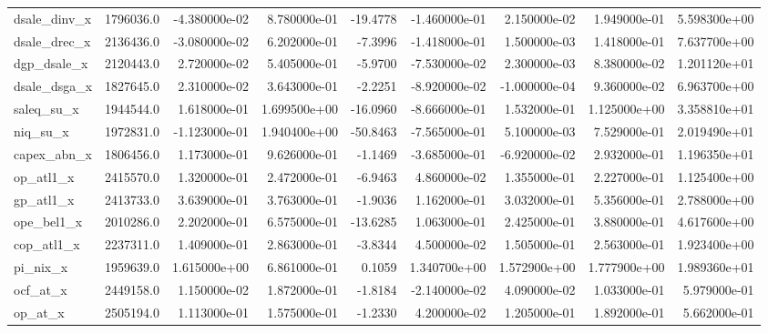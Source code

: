 \documentclass[10pt]{article}
\begin{document}
\begin{landscape}
\begin{longtable}{|l|r|r|r|r|r|r|r|r|}
dsale\_dinv\_x            &  1796036.0 & -4.380000e-02 &  8.780000e-01 &    -19.4778 & -1.460000e-01 &  2.150000e-02 &  1.949000e-01 &  5.598300e+00 \\
dsale\_drec\_x            &  2136436.0 & -3.080000e-02 &  6.202000e-01 &     -7.3996 & -1.418000e-01 &  1.500000e-03 &  1.418000e-01 &  7.637700e+00 \\
dgp\_dsale\_x             &  2120443.0 &  2.720000e-02 &  5.405000e-01 &     -5.9700 & -7.530000e-02 &  2.300000e-03 &  8.380000e-02 &  1.201120e+01 \\
dsale\_dsga\_x            &  1827645.0 &  2.310000e-02 &  3.643000e-01 &     -2.2251 & -8.920000e-02 & -1.000000e-04 &  9.360000e-02 &  6.963700e+00 \\
saleq\_su\_x              &  1944544.0 &  1.618000e-01 &  1.699500e+00 &    -16.0960 & -8.666000e-01 &  1.532000e-01 &  1.125000e+00 &  3.358810e+01 \\
niq\_su\_x                &  1972831.0 & -1.123000e-01 &  1.940400e+00 &    -50.8463 & -7.565000e-01 &  5.100000e-03 &  7.529000e-01 &  2.019490e+01 \\
capex\_abn\_x             &  1806456.0 &  1.173000e-01 &  9.626000e-01 &     -1.1469 & -3.685000e-01 & -6.920000e-02 &  2.932000e-01 &  1.196350e+01 \\
op\_atl1\_x               &  2415570.0 &  1.320000e-01 &  2.472000e-01 &     -6.9463 &  4.860000e-02 &  1.355000e-01 &  2.227000e-01 &  1.125400e+00 \\
gp\_atl1\_x               &  2413733.0 &  3.639000e-01 &  3.763000e-01 &     -1.9036 &  1.162000e-01 &  3.032000e-01 &  5.356000e-01 &  2.788000e+00 \\
ope\_bel1\_x              &  2010286.0 &  2.202000e-01 &  6.575000e-01 &    -13.6285 &  1.063000e-01 &  2.425000e-01 &  3.880000e-01 &  4.617600e+00 \\
cop\_atl1\_x              &  2237311.0 &  1.409000e-01 &  2.863000e-01 &     -3.8344 &  4.500000e-02 &  1.505000e-01 &  2.563000e-01 &  1.923400e+00 \\
pi\_nix\_x                &  1959639.0 &  1.615000e+00 &  6.861000e-01 &      0.1059 &  1.340700e+00 &  1.572900e+00 &  1.777900e+00 &  1.989360e+01 \\
ocf\_at\_x                &  2449158.0 &  1.150000e-02 &  1.872000e-01 &     -1.8184 & -2.140000e-02 &  4.090000e-02 &  1.033000e-01 &  5.979000e-01 \\
op\_at\_x                 &  2505194.0 &  1.113000e-01 &  1.575000e-01 &     -1.2330 &  4.200000e-02 &  1.205000e-01 &  1.892000e-01 &  5.662000e-01 \\

\end{longtable}
\end{landscape}
\end{document}
